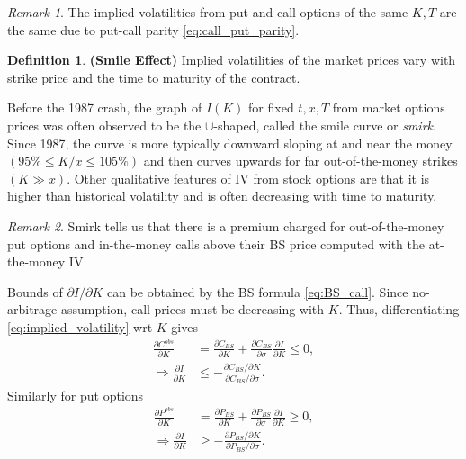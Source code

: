 \documentclass[a4paper,12pt]{article}
\numberwithin{equation}{section}
\theoremstyle{definition}
\newtheorem{definition}{Definition}[section]
\theoremstyle{remark}
\newtheorem{remark}{Remark}[section]
\begin{document}
\begin{remark}
The implied volatilities from put and call options of the same $K,T$ 
are the same due to put-call parity \eqref{eq:call_put_parity}.
\end{remark}

\begin{definition}
\textbf{(Smile Effect)} Implied volatilities of the market prices 
vary with strike price and the time to maturity of the contract.
\end{definition}

Before the 1987 crash, the graph of $I(K)$ for fixed $t,x,T$ 
from market options prices was often observed to be the 
$\cup$-shaped, called the smile curve or \textit{smirk}. Since 1987, 
the curve is more typically downward sloping at and near the money 
$(95\%\leq K/x\leq105\%)$ and then curves upwards for far 
out-of-the-money strikes $(K\gg x)$. Other qualitative features of 
IV from stock options are that it is higher than historical 
volatility and is often decreasing with time to maturity.

\begin{remark}
Smirk tells us that there is a premium 
charged for out-of-the-money put options and in-the-money calls 
above their BS price computed with the at-the-money IV.
\end{remark}

Bounds of $\partial I/\partial K$ can be obtained by the 
BS formula \eqref{eq:BS_call}. Since no-arbitrage assumption, call 
prices must be decreasing with $K$. Thus, differentiating 
\eqref{eq:implied_volatility} wrt $K$ gives 
\begin{equation}
    \begin{split}
        \frac{\partial C^{obs}}{\partial K}&=
        \frac{\partial C_{BS}}{\partial K}+
        \frac{\partial C_{BS}}{\partial \sigma}
        \frac{\partial I}{\partial K}\leq 0, \\
        \Rightarrow\frac{\partial I}{\partial K}&\leq 
        -\frac{\partial C_{BS}/\partial K}{\partial C_{BS}/\partial \sigma}.
    \end{split}
\end{equation}
Similarly for put options 
\begin{equation}
    \begin{split}
        \frac{\partial P^{obs}}{\partial K}&=
        \frac{\partial P_{BS}}{\partial K}+
        \frac{\partial P_{BS}}{\partial \sigma}
        \frac{\partial I}{\partial K}\geq 0, \\
        \Rightarrow\frac{\partial I}{\partial K}&\geq 
        -\frac{\partial P_{BS}/\partial K}{\partial P_{BS}/\partial \sigma}.
    \end{split}
\end{equation}
\end{document}
